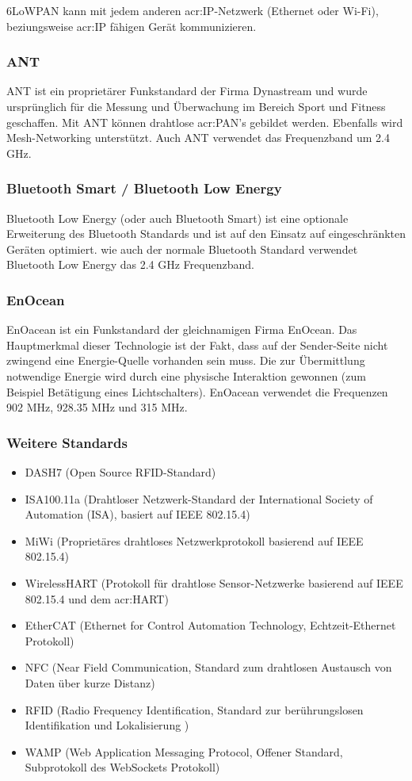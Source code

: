 6LoWPAN kann mit jedem anderen \gls{acr:IP}-Netzwerk (Ethernet oder Wi-Fi), beziungsweise \gls{acr:IP} fähigen Gerät kommunizieren. 

\subsubsection{ANT}
ANT ist ein proprietärer Funkstandard der Firma Dynastream und wurde ursprünglich für die Messung und Überwachung im Bereich Sport und Fitness geschaffen. Mit ANT können drahtlose \gls{acr:PAN}'s gebildet werden. Ebenfalls wird Mesh-Networking unterstützt. Auch ANT verwendet das Frequenzband um 2.4 GHz.


\subsubsection{Bluetooth Smart / Bluetooth Low Energy}
Bluetooth Low Energy (oder auch Bluetooth Smart) ist eine optionale Erweiterung des Bluetooth Standards und ist auf den Einsatz auf eingeschränkten Geräten optimiert. wie auch der normale Bluetooth Standard verwendet Bluetooth Low Energy das 2.4 GHz Frequenzband.


\subsubsection{EnOcean}
EnOacean ist ein Funkstandard der gleichnamigen Firma EnOcean. Das Hauptmerkmal dieser Technologie ist der Fakt, dass auf der Sender-Seite nicht zwingend eine Energie-Quelle vorhanden sein muss. Die zur Übermittlung notwendige Energie wird durch eine physische Interaktion gewonnen (zum Beispiel Betätigung eines Lichtschalters). EnOacean verwendet die Frequenzen 902 MHz, 928.35 MHz und 315 MHz.


\subsubsection{Weitere Standards}
\begin{itemize}
\item DASH7 (Open Source RFID-Standard)
\item ISA100.11a (Drahtloser Netzwerk-Standard der International Society of Automation (ISA), basiert auf IEEE 802.15.4)
\item MiWi (Proprietäres drahtloses Netzwerkprotokoll basierend auf IEEE 802.15.4)
\item WirelessHART (Protokoll für drahtlose Sensor-Netzwerke basierend auf IEEE 802.15.4 und dem \gls{acr:HART})
\item EtherCAT (Ethernet for Control Automation Technology, Echtzeit-Ethernet Protokoll)
\item NFC (Near Field Communication, Standard zum drahtlosen Austausch von Daten über kurze Distanz)
\item RFID (Radio Frequency Identification, Standard zur berührungslosen Identifikation und Lokalisierung )
\item WAMP (Web Application Messaging Protocol, Offener Standard, Subprotokoll des WebSockets Protokoll)
\end{itemize}


